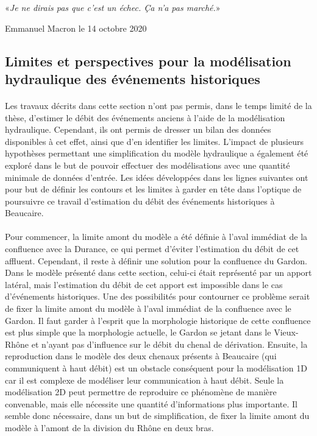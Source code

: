 	\epigraph{«\textit{Je ne dirais pas que c'est un échec. Ça n'a pas marché.}»}{Emmanuel Macron le 14 octobre 2020}
		
	\FloatBarrier	
	\subsection{Limites et perspectives pour la modélisation hydraulique des événements historiques}
	
	\paragraph{} Les travaux décrits dans cette section n'ont pas permis, dans le temps limité de la thèse, d'estimer le débit des événements anciens à l'aide de la modélisation hydraulique. Cependant, ils ont permis de dresser un bilan des données disponibles à cet effet, ainsi que d'en identifier les limites. L'impact de plusieurs hypothèses permettant une simplification du modèle hydraulique a également été exploré dans le but de pouvoir effectuer des modélisations avec une quantité minimale de données d'entrée. Les idées développées dans les lignes suivantes ont pour but de définir les contours et les limites à garder en tête dans l'optique de poursuivre ce travail d'estimation du débit des événements historiques à Beaucaire.
	
	\paragraph{} Pour commencer, la limite amont du modèle a été définie à l'aval immédiat de la confluence avec la Durance, ce qui permet d'éviter l'estimation du débit de cet affluent. Cependant, il reste à définir une solution pour la confluence du Gardon. Dans le modèle présenté dans cette section, celui-ci était représenté par un apport latéral, mais l'estimation du débit de cet apport est impossible dans le cas d'événements historiques. Une des possibilités pour contourner ce problème serait de fixer la limite amont du modèle à l'aval immédiat de la confluence avec le Gardon. Il faut garder à l'esprit que la morphologie historique de cette confluence est plus simple que la morphologie actuelle, le Gardon se jetant dans le Vieux-Rhône et n'ayant pas d'influence sur le débit du chenal de dérivation. Ensuite, la reproduction dans le modèle des deux chenaux présents à Beaucaire (qui communiquent à haut débit) est un obstacle conséquent pour la modélisation 1D car il est complexe de modéliser leur communication à haut débit. Seule la modélisation 2D peut permettre de reproduire ce phénomène de manière convenable, mais elle nécessite une quantité d'informations plus importante. Il semble donc nécessaire, dans un but de simplification, de fixer la limite amont du modèle à l'amont de la division du Rhône en deux bras. 
	
